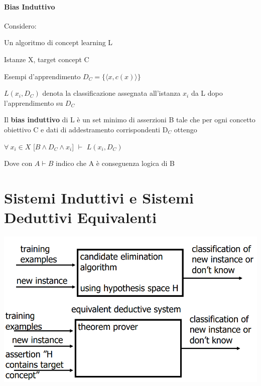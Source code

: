 \documentclass[10pt]{book}
\begin{document}
\paragraph{Bias Induttivo} Considero:
\begin{list}{}{}
	\item Un algoritmo di concept learning L
	\item Istanze X, target concept C
	\item Esempi d'apprendimento $D_C = \{\langle x, c(x)\rangle\}$
	\item $L(x_i, D_C)$ denota la classificazione assegnata all'istanza $x_i$ da L dopo l'apprendimento su $D_C$
\end{list}
Il \textbf{bias induttivo} di L è un set minimo di asserzioni B tale che per ogni concetto obiettivo C e dati di addestramento corrispondenti D$_C$ ottengo
\begin{list}{}{}
	\item $\forall\:x_i\in X$ [$B \wedge D_C \wedge x_i$] $\vdash$ $L(x_i, D_C)$\\
\end{list}
Dove con $A \vdash B$ indico che A è conseguenza logica di B
\section{Sistemi Induttivi e Sistemi Deduttivi Equivalenti}
\begin{center}
	\includegraphics[scale=0.55]{ml4.png}
\end{center}
\end{document}
